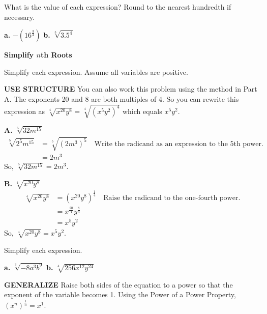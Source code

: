 \documentclass{article}
\newenvironment{example}[1]{}{}
\newenvironment{tryit}[1]{}{}
\begin{document}
\begin{tryit}{3}
What is the value of each expression? Round to the nearest hundredth if necessary.

\textbf{a.} $-(16^{\frac{3}{4}})$ \qquad \textbf{b.} $\sqrt[5]{3.5^4}$
\end{tryit}

\begin{example}{4}
\textbf{Simplify $n$th Roots}

Simplify each expression. Assume all variables are positive.

\textbf{USE STRUCTURE}
You can also work this problem using the method in Part A. The exponents 20 and 8 are both multiples of 4. So you can rewrite this expression as $\sqrt[4]{x^{20}y^8} = \sqrt[4]{(x^5y^2)^4}$ which equals $x^5y^2$.

\textbf{A.} $\sqrt[5]{32m^{15}}$
\begin{align*}
\sqrt[5]{2^5m^{15}} &= \sqrt[5]{(2m^3)^5} \quad \text{Write the radicand as an expression to the 5th power.} \\
&= 2m^3
\end{align*}
So, $\sqrt[5]{32m^{15}} = 2m^3$.

\textbf{B.} $\sqrt[4]{x^{20}y^8}$
\begin{align*}
\sqrt[4]{x^{20}y^8} &= (x^{20}y^8)^{\frac{1}{4}} \quad \text{Raise the radicand to the one-fourth power.} \\
&= x^{\frac{20}{4}}y^{\frac{8}{4}} \\
&= x^5y^2
\end{align*}
So, $\sqrt[4]{x^{20}y^8} = x^5y^2$.
\end{example}

\begin{tryit}{4}
Simplify each expression.

\textbf{a.} $\sqrt[3]{-8a^3b^9}$ \qquad \textbf{b.} $\sqrt[4]{256x^{12}y^{24}}$
\end{tryit}

\textbf{GENERALIZE}
Raise both sides of the equation to a power so that the exponent of the variable becomes 1. Using the Power of a Power Property, $(x^n)^{\frac{1}{n}} = x^1$.
\end{document}
